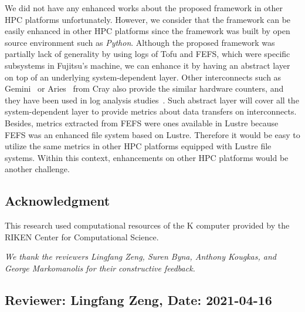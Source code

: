 \documentclass{jhps}
\begin{document}
We did not have any enhanced works about the proposed framework
in other HPC platforms unfortunately.
However, we consider that the framework can be easily enhanced
in other HPC platforms since the framework was built
by open source environment such as {\itshape Python}.
Although the proposed framework was partially lack of generality
by using logs of Tofu and FEFS, which were specific subsystems in Fujitsu's machine,
we can enhance it by having an abstract layer
on top of an underlying system-dependent layer.
Other interconnects such as Gemini~\cite{alverson:hoti10,pedretti:cug13} or
Aries~\cite{cray:aries_overview,cray:aries_hardware_counters}
from Cray also provide the similar hardware counters,
and they have been used in
log analysis studies~\cite{chunduri:pmbs19,ahlgren:cug18,zimmer:cug16,pedretti:cug13}.
Such abstract layer will cover all the system-dependent layer to
provide metrics about data transfers on interconnects.
Besides, metrics extracted from FEFS were ones available in Lustre
because FEFS was an enhanced file system based on Lustre.
Therefore it would be easy to utilize the same metrics in
other HPC platforms equipped with Lustre file systems.
Within this context, enhancements on other HPC platforms would be
another challenge.

\subsection*{Acknowledgment}

This research used computational resources of the K computer
provided by the RIKEN Center for Computational Science.

\textit{We thank the reviewers Lingfang Zeng, Suren Byna, Anthony Kougkas,
and George Markomanolis for their constructive feedback.}



\reviews   %

\subsection*{Reviewer: Lingfang Zeng, Date: 2021-04-16}
\end{document}
